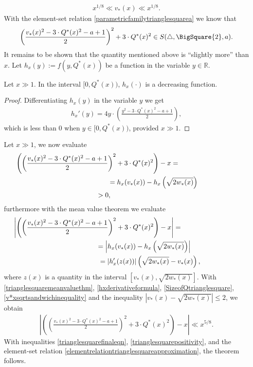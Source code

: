 \documentclass[12pt]{amsart}
\newcommand{\1}{\mathmybb{1}}
\begin{document}
\begin{align}
\label{v*xsqrtsandwichinequality}
x^{1/8}\ll v_{*}(x) \ll x^{1/8}.
\end{align}
With the element-set relation \eqref{parametricfamilytrianglesquarea} we know that
\begin{align}
\label{elementrelationtrianglesquareapproximation}
\left(\frac{v_{*}(x)^2-3\cdot Q^{*}(x)^2-a+1}{2}\right)^2 +3\cdot Q^{*}(x)^2 \in S(\triangle, \BigSquare{2},a).
\end{align}
It remains to be shown that the quantity mentioned above is ``slightly more'' than $x$. Let $h_{x}(y) := f(y,Q^{*}(x))$ be a function in the variable $y \in \mathbb{R}$.
\begin{lem}
Let $x \gg 1$. In the interval $[0,Q^{*}(x))$, $h_{x}(\cdot)$ is a decreasing function.
\end{lem}
\begin{proof}
Differentiating $h_{x}(y)$ in the variable $y$ we get
\begin{align}
\label{hxderivativeformula}
h_{x}'(y) = 4y\cdot\left(\frac{y^2-3\cdot Q^{*}(x)^2-a+1}{2} \right),
\end{align}
which is less than $0$ when $y \in [0,Q^{*}(x))$, provided $x \gg 1$.
\end{proof}
Let $x \gg 1$, we now evaluate
\begin{align}
\label{trianglesquarepositivity}
\left(\left(\frac{v_{*}(x)^2-3\cdot Q^{*}(x)^2-a+1}{2}\right)^2 +3\cdot Q^{*}(x)^2\right) - x = \hspace{3cm} \notag\\
=h_{x}(v_{*}(x)) - h_{x}\left(\sqrt{2w_{*}(x)}\right)\hspace{2cm} \notag\\
> 0,\hspace{6.5cm}
\end{align}
furthermore with the mean value theorem we evaluate
\begin{align}
\label{trianglesquaremeanvaluethm}
\left|\left(\left(\frac{v_{*}(x)^2-3\cdot Q^{*}(x)^2-a+1}{2}\right)^2 +3\cdot Q^{*}(x)^2\right) - x\right| = \hspace{3cm} \notag\\
= \left|h_{x}(v_{*}(x)) - h_{x}\left(\sqrt{2w_{*}(x)}\right)\right|\hspace{2.5cm}\notag\\
=\left|h_{x}'(z(x))\right|\left(\sqrt{2w_{*}(x)} - v_{*}(x) \right),\hspace{2cm}
\end{align}
where $z(x)$ is a quantity in the interval $\left[v_{*}(x), \sqrt{2w_{*}(x)}\right]$. With \eqref{trianglesquaremeanvaluethm}, \eqref{hxderivativeformula}, \eqref{SizeofQtrianglesquare}, \eqref{v*xsqrtsandwichinequality} and the inequality $\left|v_{*}(x) - \sqrt{2w_{*}(x)}\right| \leq 2$, we obtain 
\begin{align}
\label{trianglesquarefinaleqn}
\left|\left(\left(\frac{v_{*}(x)^2-3\cdot Q^{*}(x)^2-a+1}{2}\right)^2 +3\cdot Q^{*}(x)^2\right) - x\right| \ll x^{5/8}.
\end{align}
With inequalities \eqref{trianglesquarefinaleqn}, \eqref{trianglesquarepositivity}, and the element-set relation \eqref{elementrelationtrianglesquareapproximation}, the theorem follows.
\end{document}
